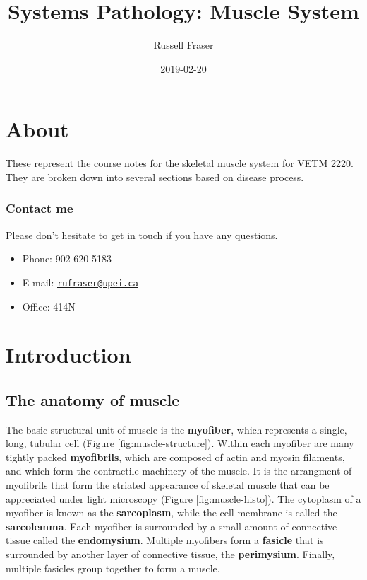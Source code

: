 \documentclass[openany]{book}
\title{Systems Pathology: Muscle System}
\author{Russell Fraser}
\date{2019-02-20}
\providecommand{\tightlist}{%
  \setlength{\itemsep}{0pt}\setlength{\parskip}{0pt}}
\begin{document}
\maketitle

{
\setcounter{tocdepth}{1}
\tableofcontents
}
\chapter*{About}\label{about}

These represent the course notes for the skeletal muscle system for VETM
2220. They are broken down into several sections based on disease
process.

\subsection*{Contact me}\label{contact-me}

Please don't hesitate to get in touch if you have any questions.

\begin{itemize}
\tightlist
\item
  Phone: 902-620-5183
\item
  E-mail: \href{mailto:rufraser@upei.ca}{\nolinkurl{rufraser@upei.ca}}
\item
  Office: 414N
\end{itemize}

\chapter{Introduction}\label{intro}

\section{The anatomy of muscle}\label{the-anatomy-of-muscle}

The basic structural unit of muscle is the \textbf{myofiber}, which
represents a single, long, tubular cell (Figure
\ref{fig:muscle-structure}). Within each myofiber are many tightly
packed \textbf{myofibrils}, which are composed of actin and myosin
filaments, and which form the contractile machinery of the muscle. It is
the arrangment of myofibrils that form the striated appearance of
skeletal muscle that can be appreciated under light microscopy (Figure
\ref{fig:muscle-histo}). The cytoplasm of a myofiber is known as the
\textbf{sarcoplasm}, while the cell membrane is called the
\textbf{sarcolemma}. Each myofiber is surrounded by a small amount of
connective tissue called the \textbf{endomysium}. Multiple myofibers
form a \textbf{fasicle} that is surrounded by another layer of
connective tissue, the \textbf{perimysium}. Finally, multiple fasicles
group together to form a muscle.
\end{document}
